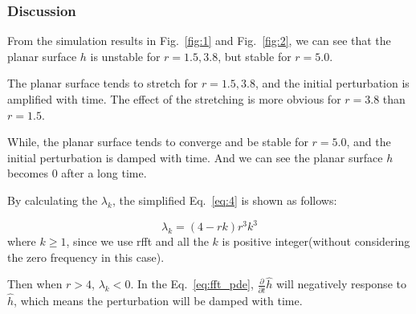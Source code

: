 \documentclass[runningheads]{llncs}
\begin{document}

\subsubsection{Discussion}
From the simulation results in Fig.~\ref{fig:1} and Fig.~\ref{fig:2}, we can see that the planar surface $h$ is unstable for $r=1.5,3.8$, but stable for $r=5.0$.

The planar surface tends to stretch for $r=1.5,3.8$, and the initial perturbation is amplified with time.
The effect of the stretching is more obvious for $r=3.8$ than $r=1.5$.

While, the planar surface tends to converge and be stable for $r=5.0$, and the initial perturbation is damped with time.
And we can see the planar surface $h$ becomes $0$ after a long time.

By calculating the $\lambda_k$, the simplified Eq.~\eqref{eq:4} is shown as follows:

\begin{equation}
    \label{eq:4}
    \lambda_k = (4-rk)r^3k^3
\end{equation}
where $k \geq 1$, since we use rfft and all the $k$ is positive integer(without considering the zero frequency in this case).

Then when $r > 4$, $\lambda_k < 0$. 
In the Eq.~\eqref{eq:fft_pde}, $\frac{\partial}{\partial t}\hat{h}$ will negatively response to $\hat{h}$, which means the perturbation will be damped with time.
\end{document}
